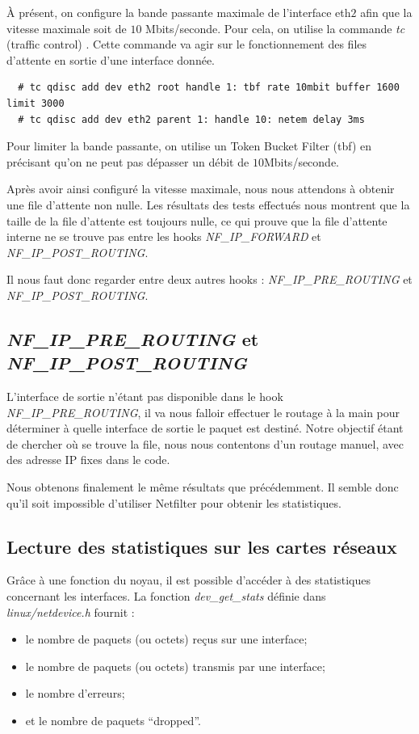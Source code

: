 \documentclass[a4paper]{article}
\begin{document}
À présent, on configure la bande passante maximale de l'interface
eth$2$ afin que la vitesse maximale soit de $10$ Mbits/seconde.
Pour cela, on utilise la commande \textit{tc} (traffic control) \cite{tc1} \cite{tcman}.
Cette commande va agir sur le fonctionnement des files d’attente
en sortie d’une interface donnée.
\begin{verbatim}
  # tc qdisc add dev eth2 root handle 1: tbf rate 10mbit buffer 1600 limit 3000
  # tc qdisc add dev eth2 parent 1: handle 10: netem delay 3ms
\end{verbatim}
Pour limiter la bande passante, on utilise un Token Bucket Filter
(tbf) en précisant qu’on ne peut pas dépasser un débit de
$10$Mbits/seconde.

Après avoir ainsi configuré la vitesse maximale,
nous nous attendons à obtenir une file d’attente non nulle.
Les résultats des tests effectués nous montrent que la taille
de la file d’attente est toujours nulle, ce qui prouve que la
file d’attente interne ne se trouve pas entre les hooks
\textit{NF\_IP\_FORWARD} et \textit{NF\_IP\_POST\_ROUTING}.

Il nous faut donc regarder entre deux autres 
hooks : \textit{NF\_IP\_PRE\_ROUTING} et \textit{NF\_IP\_POST\_ROUTING}.

\subsection{\textit{NF\_IP\_PRE\_ROUTING} et \textit{NF\_IP\_POST\_ROUTING}}
L'interface de sortie n'étant pas disponible dans le hook \textit{NF\_IP\_PRE\_ROUTING},
il va nous falloir effectuer le routage à la main pour déterminer à quelle interface de sortie le paquet est destiné. Notre
objectif étant de chercher où se trouve la file, nous nous
contentons d'un routage manuel, avec des adresse IP fixes dans le code.

Nous obtenons finalement le même résultats que précédemment. 
Il semble donc qu'il soit impossible d'utiliser Netfilter pour
obtenir les statistiques. 

\subsection{Lecture des statistiques sur les cartes réseaux}
Grâce à une fonction du noyau, il est possible d’accéder à des
statistiques concernant les interfaces. La fonction \textit{dev\_get\_stats}
définie dans \textit{linux/netdevice.h} fournit :
\begin{itemize}
	\item le nombre de paquets (ou octets) reçus sur une interface;
	\item le nombre de paquets (ou octets) transmis par une interface;
	\item le nombre d’erreurs;
	\item et le nombre de paquets “dropped”.
\end{itemize}
\end{document}
